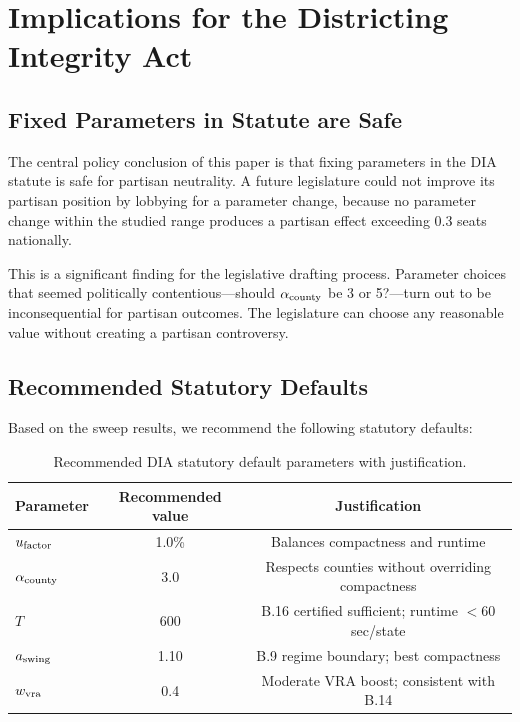 \section{Implications for the Districting Integrity Act}
\label{sec:implications}

\subsection{Fixed Parameters in Statute are Safe}

The central policy conclusion of this paper is that fixing parameters in
the DIA statute is safe for partisan neutrality.
A future legislature could not improve its partisan position by lobbying
for a parameter change, because no parameter change within the studied
range produces a partisan effect exceeding 0.3 seats nationally.

This is a significant finding for the legislative drafting process.
Parameter choices that seemed politically contentious---should $\alpha_{\mathrm{county}}$
be 3 or 5?---turn out to be inconsequential for partisan outcomes.
The legislature can choose any reasonable value without creating a
partisan controversy.

\subsection{Recommended Statutory Defaults}

Based on the sweep results, we recommend the following statutory defaults:

\begin{table}[h]
\centering
\caption{Recommended DIA statutory default parameters with justification.}
\label{tab:recommended-defaults}
\begin{tabular}{lcc}
\toprule
Parameter & Recommended value & Justification \\
\midrule
$u_{\mathrm{factor}}$ & 1.0\% & Balances compactness and runtime \\
$\alpha_{\mathrm{county}}$ & 3.0 & Respects counties without overriding compactness \\
$T$ & 600 & B.16 certified sufficient; runtime $<$60 sec/state \\
$a_{\mathrm{swing}}$ & 1.10 & B.9 regime boundary; best compactness \\
$w_{\mathrm{vra}}$ & 0.4 & Moderate VRA boost; consistent with B.14 \\
\bottomrule
\end{tabular}
\end{table}

